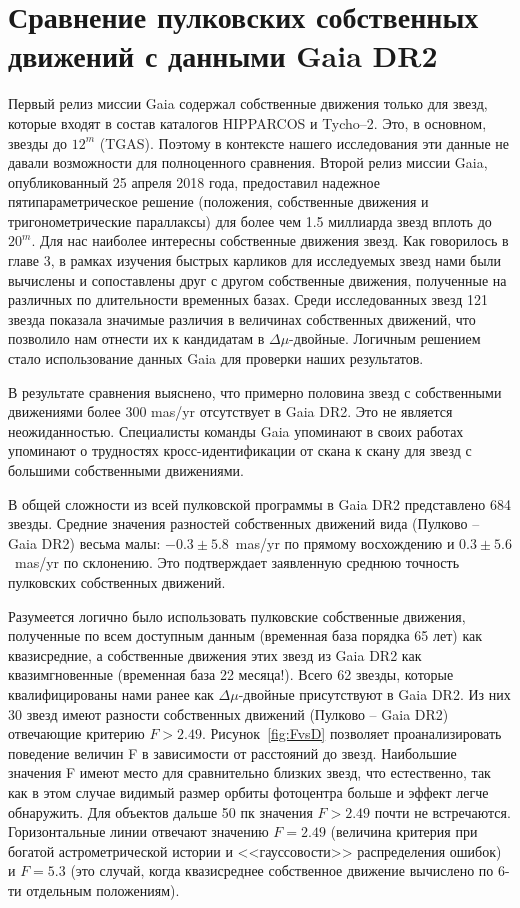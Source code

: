 \chapter{Сравнение пулковских собственных движений с данными Gaia DR2} \label{ch:ch6}
Первый релиз миссии Gaia содержал собственные движения только для звезд, которые входят в состав каталогов HIPPARCOS и Tycho--2. Это, в основном, звезды до $12^m$ (TGAS). Поэтому в контексте нашего исследования эти данные не давали возможности для полноценного сравнения. Второй релиз миссии Gaia, опубликованный 25 апреля 2018 года, предоставил надежное пятипараметрическое решение (положения, собственные движения и тригонометрические параллаксы) для более чем 1.5 миллиарда звезд  вплоть до $20^m$. Для нас наиболее интересны собственные движения звезд. Как говорилось в главе 3, в рамках изучения быстрых карликов для исследуемых звезд нами  были вычислены и сопоставлены друг с другом собственные движения, полученные на различных по длительности временных базах. Среди исследованных звезд 121 звезда показала значимые различия в величинах собственных движений, что позволило нам отнести их к кандидатам в $\Delta\mu$-двойные. Логичным решением стало использование данных Gaia для проверки наших результатов.

В результате сравнения выяснено, что примерно половина звезд с собственными движениями более 300 mas/yr отсутствует в Gaia DR2. Это не является неожиданностью. Специалисты команды Gaia упоминают в своих работах \cite{2018A&A...616A...2L} упоминают о трудностях кросс-идентификации от скана к скану для звезд с большими собственными движениями.

В общей сложности из всей пулковской программы в Gaia DR2 представлено 684 звезды. Средние значения разностей собственных движений вида (Пулково -- Gaia DR2) весьма малы: $-0.3\pm5.8$~mas/yr по прямому восхождению и $0.3\pm5.6$~mas/yr по склонению. Это подтверждает заявленную среднюю точность пулковских собственных движений.

Разумеется логично было использовать пулковские собственные движения, полученные по всем доступным данным (временная база порядка 65 лет) как квазисредние, а собственные движения этих звезд из Gaia DR2 как квазимгновенные (временная база 22 месяца!). Всего 62 звезды, которые квалифицированы нами ранее как $\Delta\mu$-двойные присутствуют в Gaia DR2. Из них 30 звезд имеют разности собственных движений  (Пулково -- Gaia DR2) отвечающие критерию $F>2.49$. Рисунок~\ref{fig:FvsD} позволяет проанализировать поведение величин F в зависимости от расстояний до звезд. Наибольшие значения F имеют место для сравнительно близких звезд, что естественно, так как в этом случае видимый размер орбиты фотоцентра больше и эффект легче обнаружить. Для объектов дальше 50 пк значения $F>2.49$ почти не встречаются. Горизонтальные линии отвечают значению $F=2.49$ (величина критерия при богатой астрометрической истории и <<гауссовости>> распределения ошибок) и $F=5.3$ (это случай, когда квазисреднее собственное движение вычислено по 6-ти отдельным положениям).


